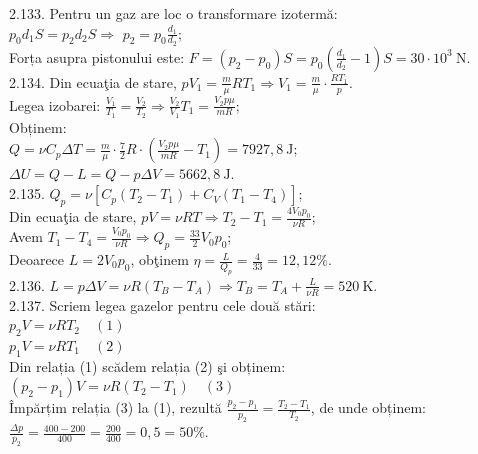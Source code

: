 2.133. Pentru un gaz are loc o transformare izotermă:\\ $p_{0} d_{1} S=p_{2} d_{2} S \Rightarrow$ $p_{2}=p_{0} \frac{d_{1}}{d_{2}}$;\\ Forța asupra pistonului este: $F=\left(p_{2}-p_{0}\right) S=p_{0}\left(\frac{d_{1}}{d_{2}}-1\right) S=30 \cdot 10^{3} \mathrm{~N}$.\\

2.134. Din ecuaţia de stare, $p V_{1}=\frac{m}{\mu} R T_{1} \Rightarrow V_{1}=\frac{m}{\mu} \cdot \frac{R T_{1}}{p}$.\\ Legea izobarei: $\frac{V_{1}}{T_{1}}=\frac{V_{2}}{T_{2}} \Rightarrow \frac{V_{2}}{V_{1}} T_{1}=\frac{V_{2} p \mu}{m R}$;\\ Obținem:\\ $Q=\nu C_{p} \Delta T=\frac{m}{\mu} \cdot \frac{7}{2} R \cdot\left(\frac{V_{2} p \mu}{m R}-T_{1}\right)=7927,8 \mathrm{~J}$;\\ $\Delta U=Q-L=Q-p \Delta V=5662,8 \mathrm{~J}$.\\

2.135. $Q_{p}=\nu\left[C_{p}\left(T_{2}-T_{1}\right)+C_{V}\left(T_{1}-T_{4}\right)\right]$;\\ Din ecuaţia de stare, $p V=\nu R T \Rightarrow T_{2}-T_{1}=\frac{4 V_{0} p_{0}}{\nu R}$;\\ Avem $T_{1}-T_{4}=\frac{V_{0} p_{0}}{\nu R} \Rightarrow Q_{p}=\frac{33}{2} V_{0} p_{0}$;\\ Deoarece $L=2 V_{0} p_{0}$, obţinem $\eta=\frac{L}{Q_{p}}=\frac{4}{33}=12,12 \%$.\\

2.136. $L=p \Delta V=\nu R\left(T_{B}-T_{A}\right) \Rightarrow T_{B}=T_{A}+\frac{L}{\nu R}=520 \mathrm{~K}$.\\

2.137. Scriem legea gazelor pentru cele două stări:\\ $p_{2} V=\nu R T_{2} \quad (1)$\\ $p_{1} V=\nu R T_{1} \quad (2)$\\ Din relația (1) scădem relația (2) şi obținem:\\ $\left(p_{2}-p_{1}\right) V=\nu R\left(T_{2}-T_{1}\right) \quad (3)$\\ Împărțim relația (3) la (1), rezultă $\frac{p_{2}-p_{1}}{p_{2}}=\frac{T_{2}-T_{1}}{T_{2}}$, de unde obținem:\\ $\frac{\Delta p}{p_{2}}=\frac{400-200}{400}=\frac{200}{400}=0,5=50 \%$.\\

